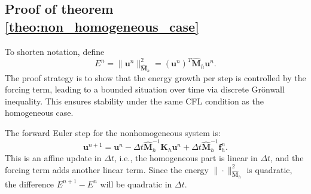 \documentclass{article}
\renewcommand{\u}{\mathbf{u}}
\newcommand{\K}{\mathbf{K}_h}
\newcommand{\M}{\hat{\mathbf{M}}_h}
\begin{document}
\subsection{Proof of theorem \ref{theo:non_homogeneous_case}}
\label{sec:proof_nonhomogeneous}

To shorten notation, define
\begin{equation}
    \nonumber
    E^n = \| \u^n\|^2_{\M} = (\u^n)^T \M \u^n.
\end{equation}
The proof strategy is to show that the energy growth per step is controlled by the forcing term, leading to a bounded situation over time via discrete Grönwall inequality. This ensures stability under the same CFL condition as the homogeneous case. 

The forward Euler step for the nonhomogeneous system is:
\begin{equation}
    \nonumber
    \u^{n+1} = \u^n - \Delta t \M^{-1} \K \u^n + \Delta t \M^{-1}\mathbf{f}_h^n.
\end{equation}
This is an affine update in $\Delta t$, i.e., the homogeneous part is linear in $\Delta t$, and the forcing term adds another linear term. Since the energy $\| \cdot \|_{\M}^2$ is quadratic, the difference $E^{n+1}-E^n$ will be quadratic in $\Delta t$.
\end{document}
